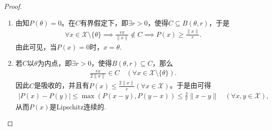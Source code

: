 \documentclass[../../main.tex]{subfiles}%
\begin{document}
\begin{proof}
\begin{enumerate}[(1)]
\item 由知$P(\theta) = 0$。在$C$有界假定下，即$\exists r > 0$，使得$C \subseteq B(\theta, r)$，于是
\begin{align*}
\forall x \in \mathscr{X} \setminus \{\theta\} \implies \frac{rx}{\|x\|} \notin C \implies P(x) \geqslant \frac{\|x\|}{r}.
\end{align*}
由此可见，当$P(x) = 0$时，$x = \theta$.
\item 若$C$以$\theta$为内点，即$\exists r > 0$，使得$B(\theta, r) \subseteq C$，那么
\begin{align*}
\frac{rx}{2\|x\|} \in C \quad (\forall x \in \mathscr{X} \setminus \{\theta\}).
\end{align*}
因此$C$是吸收的，并且有$P(x) \leqslant \frac{2\|x\|}{r} (\forall x \in \mathscr{X})$。于是由可得
\begin{align*}
|P(x) - P(y)| \leqslant \max(P(x - y), P(y - x)) \leqslant \frac{2}{r} \|x - y\| \quad (\forall x, y \in \mathscr{X}),
\end{align*}
从而$P(x)$是Lipschitz连续的.
\end{enumerate}
\end{proof}
\end{document}

